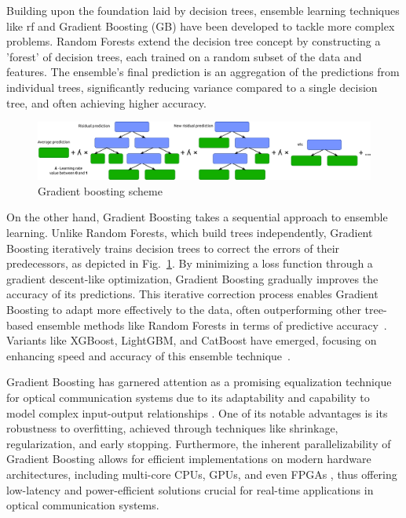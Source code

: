 Building upon the foundation laid by decision trees, ensemble learning techniques like 
\acrfull{rf}
and Gradient Boosting (GB) have been developed to tackle more complex problems. Random Forests extend the decision tree concept by constructing a 'forest' of decision trees, each trained on a random subset of the data and features. The ensemble's final prediction is an aggregation of the predictions from individual trees, significantly reducing variance compared to a single decision tree, and often achieving higher accuracy.

\begin{figure}[ht]
   \centering
    \includegraphics[width=1\linewidth]{images/boost/boosting_scheme.pdf}
    \caption{Gradient boosting scheme}
    \label{fig:boosting_scheme}
\end{figure}

On the other hand, Gradient Boosting takes a sequential approach to ensemble learning. Unlike Random Forests, which build trees independently, Gradient Boosting iteratively trains decision trees to correct the errors of their predecessors, as depicted in Fig.~\ref{fig:boosting_scheme}. By minimizing a loss function through a gradient descent-like optimization, Gradient Boosting gradually improves the accuracy of its predictions. This iterative correction process enables Gradient Boosting to adapt more effectively to the data, often outperforming other tree-based ensemble methods like Random Forests in terms of predictive accuracy~\cite{natekin2013gradient}. Variants like XGBoost, LightGBM, and CatBoost have emerged, focusing on enhancing speed and accuracy of this ensemble technique~\cite{bentejac2021comparative}.


Gradient Boosting has garnered attention as a promising equalization technique for optical communication systems due to its adaptability and capability to model complex input-output relationships \cite{Chen:2016:XST:2939672.2939785,natekin2013gradient,friedman2002stochastic,bentejac2021comparative}. One of its notable advantages is its robustness to overfitting, achieved through techniques like shrinkage, regularization, and early stopping. Furthermore, the inherent parallelizability of Gradient Boosting allows for efficient implementations on modern hardware architectures, including multi-core CPUs, GPUs, and even FPGAs \cite{alcolea2021fpga}, thus offering low-latency and power-efficient solutions crucial for real-time applications in optical communication systems.

